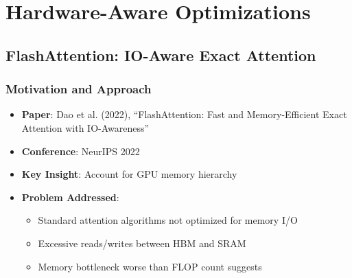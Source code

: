\documentclass[11pt]{article}
\begin{document}
\section{Hardware-Aware Optimizations}

\subsection{FlashAttention: IO-Aware Exact Attention}

\subsubsection{Motivation and Approach}
\begin{itemize}[leftmargin=*]
    \item \textbf{Paper}: Dao et al. (2022), ``FlashAttention: Fast and Memory-Efficient Exact Attention with IO-Awareness''~\cite{dao2022flashattention}
    \item \textbf{Conference}: NeurIPS 2022
    \item \textbf{Key Insight}: Account for GPU memory hierarchy
    \item \textbf{Problem Addressed}:
    \begin{itemize}
        \item Standard attention algorithms not optimized for memory I/O
        \item Excessive reads/writes between HBM and SRAM
        \item Memory bottleneck worse than FLOP count suggests
    \end{itemize}
\end{itemize}
\end{document}
